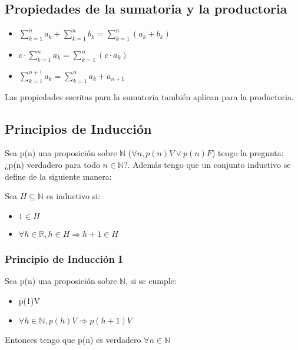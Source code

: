 \documentclass{report}
\begin{document}
\subsection{Propiedades de la sumatoria y la productoria}
\begin{itemize}
    \item \begin{math}
        \sum_{k=1}^n a_k + \sum_{k=1}^n b_k = \sum_{k=1}^n (a_k + b_k)
    \end{math}
    \item \begin{math}
        c \cdot \sum_{k=1}^n a_k = \sum_{k=1}^n (c \cdot a_k)
    \end{math}
    \item \begin{math}
        \sum_{k=1}^{n+1} a_k = \sum_{k=1}^n a_k + a_{n+1}
    \end{math}
\end{itemize}

Las propiedades escritas para la sumatoria también aplican para la productoria.

\subsection{Principios de Inducción}
Sea p(n) una proposición sobre $\mathbb{N}$ ($\forall n, p(n)V \lor p(n)F$) tengo la pregunta: ¿p(n) verdadero para todo $n \in \mathbb{N}$?. Además tengo que un conjunto inductivo se define de la siguiente manera:

Sea $H \subseteq \mathbb{N}$ es inductivo si: \begin{itemize}
    \item $1 \in H$
    \item $\forall h \in \mathbb{R}, h \in H \Rightarrow h + 1 \in H$
\end{itemize}

\subsubsection{Principio de Inducción I}
Sea p(n) una proposición sobre $\mathbb{N}$, si se cumple: \begin{itemize}
    \item p(1)V
    \item $\forall h \in \mathbb{N}, p(h)V \Rightarrow p(h+1)V$
\end{itemize}
Entonces tengo que p(n) es verdadero $\forall n \in \mathbb{N}$
\end{document}
